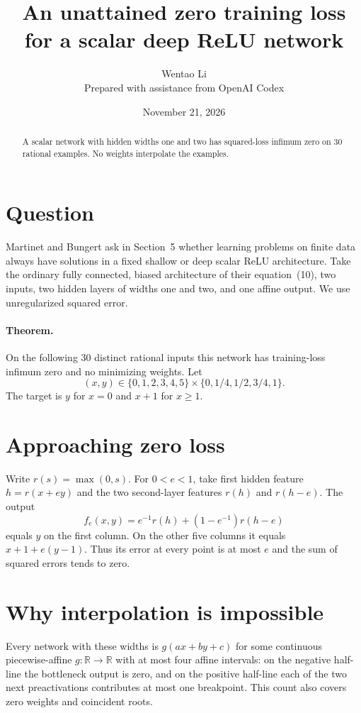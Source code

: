 \documentclass[11pt]{article}
\title{An unattained zero training loss for a scalar deep ReLU network}
\author{Wentao Li\\{\small Prepared with assistance from OpenAI Codex}}
\date{November 21, 2026}
\begin{document}
\maketitle
\begin{abstract}
A scalar network with hidden widths one and two has squared-loss infimum zero on 30 rational examples. No weights interpolate the examples.
\end{abstract}
\section*{Question}
Martinet and Bungert ask in Section~5 whether learning problems on finite data always have solutions in a fixed shallow or deep scalar ReLU architecture. Take the ordinary fully connected, biased architecture of their equation~(10), two inputs, two hidden layers of widths one and two, and one affine output. We use unregularized squared error.

\paragraph{Theorem.} On the following 30 distinct rational inputs this network has training-loss infimum zero and no minimizing weights. Let
\[
 (x,y)\in\{0,1,2,3,4,5\}\times\{0,1/4,1/2,3/4,1\}.
\]
The target is $y$ for $x=0$ and $x+1$ for $x\geq1$.

\section*{Approaching zero loss}
Write $r(s)=\max(0,s)$. For $0<e<1$, take first hidden feature $h=r(x+ey)$ and the two second-layer features $r(h)$ and $r(h-e)$. The output
\[
 f_e(x,y)=e^{-1}r(h)+(1-e^{-1})r(h-e)
\]
equals $y$ on the first column. On the other five columns it equals $x+1+e(y-1)$. Thus its error at every point is at most $e$ and the sum of squared errors tends to zero.

\section*{Why interpolation is impossible}
Every network with these widths is $g(ax+by+c)$ for some continuous piecewise-affine $g:\mathbb R\to\mathbb R$ with at most four affine intervals: on the negative half-line the bottleneck output is zero, and on the positive half-line each of the two next preactivations contributes at most one breakpoint. This count also covers zero weights and coincident roots.
\end{document}
